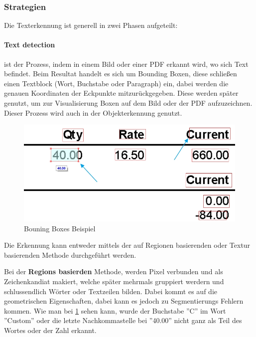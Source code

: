\subsubsection{Strategien}

Die Texterkennung ist generell in zwei Phasen aufgeteilt:

\paragraph{Text detection} ist der Prozess, indem in einem Bild oder einer PDF erkannt wird, wo sich Text befindet. Beim Resultat handelt es sich um Bounding Boxen, diese schließen einen Textblock (Wort, Buchstabe oder Paragraph) ein, dabei werden die genauen Koordinaten der Eckpunkte mitzurückgegeben. Diese werden später genutzt, um zur Visualisierung Boxen auf dem Bild oder der PDF aufzuzeichnen. Dieser Prozess wird auch in der Objekterkennung genutzt.

\begin{figure}[h]
    \includegraphics[scale=0.5]{sections/machine-learning/images/bounding-boxes.png}
    \caption{Bouning Boxes Beispiel}
    \label{fig:bounding-boxes}
\end{figure}

Die Erkennung kann entweder mittels der auf Regionen basierenden oder Textur basierenden Methode durchgeführt werden.

Bei der \textbf{Regions basierden} Methode, werden Pixel verbunden und als Zeichenkandiat makiert, welche später mehrmals gruppiert werdern und schlussendlich Wörter oder Textzeilen bilden. Dabei kommt es auf die geometrischen Eigenschaften, dabei kann es jedoch zu Segmentierungs Fehlern kommen. Wie man bei \ref{fig:bounding-boxes} sehen kann, wurde der Buchstabe ''C'' im Wort ''Custom'' oder die letzte Nachkommastelle bei ''40.00'' nicht ganz als Teil des Wortes oder der Zahl erkannt.

